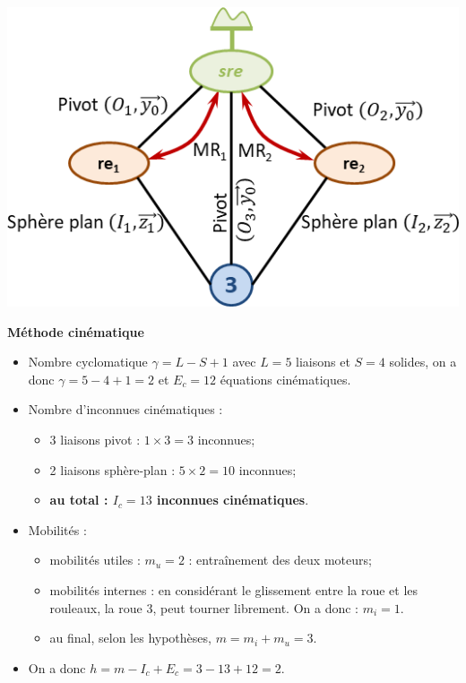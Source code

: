 \documentclass[10pt,fleqn]{article} %
\begin{document}
\begin{center}
\includegraphics[width=.7\linewidth]{images/fig_02}
\end{center}
\begin{multicols}{2}
\textbf{Méthode cinématique}
\begin{itemize}
\item Nombre cyclomatique $\gamma = L-S+1 $ avec $L=5$ liaisons et $S=4$ solides, on a donc $\gamma = 5-4+1=2$ et $E_c=12$ équations cinématiques.
\item Nombre d'inconnues cinématiques : 
\begin{itemize}
\item 3 liaisons pivot : $1\times 3=3$ inconnues;
\item 2 liaisons sphère-plan : $5\times 2=10$ inconnues;
\item \textbf{au total : $I_c=13$ inconnues cinématiques}.
\end{itemize}
\item Mobilités : 
\begin{itemize}
\item mobilités utiles : $m_u=2$ : entraînement des deux moteurs;
\item mobilités internes : en considérant le glissement entre la roue et les rouleaux, la roue 3, peut tourner librement. On a donc : $m_i =1$. %
\item au final, selon les hypothèses, $m=m_i+m_u=3$.
\end{itemize}
\item On a donc $h=m-I_c+E_c =3-13+12=2$.
\end{itemize}

\vfill\null
\columnbreak


\end{multicols}
\end{document}
